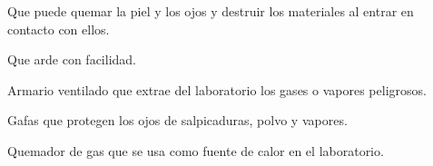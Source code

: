 \begin{vocabulary}
    Que puede quemar la piel y los ojos y destruir los materiales al entrar en contacto con ellos.
\end{vocabulary}

\begin{vocabulary}
    Que arde con facilidad.
\end{vocabulary}

\begin{vocabulary}
    Armario ventilado que extrae del laboratorio los gases o vapores peligrosos.
\end{vocabulary}

\begin{vocabulary}
    Gafas que protegen los ojos de salpicaduras, polvo y vapores.
\end{vocabulary}

\begin{vocabulary}
    Quemador de gas que se usa como fuente de calor en el laboratorio.
\end{vocabulary}

